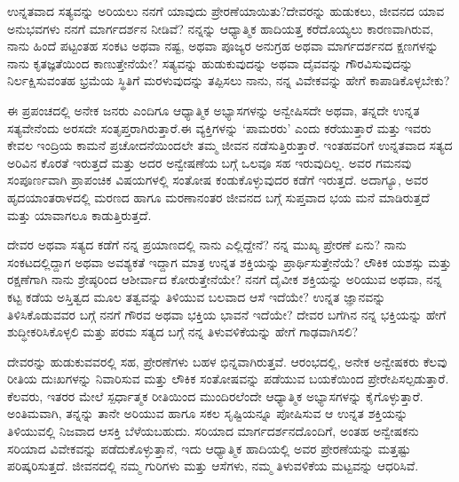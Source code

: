\begin{mananam}{}
\nfntmtxt ಉನ್ನತವಾದ ಸತ್ಯವನ್ನು ಅರಿಯಲು ನನಗೆ ಯಾವುದು ಪ್ರೇರಣೆಯಾಯಿತು?ದೇವರನ್ನು ಹುಡುಕಲು, ಜೀವನದ ಯಾವ ಅನುಭವಗಳು  ನನಗೆ ಮಾರ್ಗದರ್ಶನ ನೀಡಿವೆ? 
ನನ್ನನ್ನು ಆಧ್ಯಾತ್ಮಿಕ ಹಾದಿಯತ್ತ ಕರೆದೊಯ್ಯಲು ಕಾರಣವಾಗಿರುವ, ನಾನು ಹಿಂದೆ ಪಟ್ಟಂತಹ ಸಂಕಟ ಅಥವಾ ನಷ್ಟ, ಅಥವಾ ಪೂಜ್ಯರ ಅನುಗ್ರಹ ಅಥವಾ ಮಾರ್ಗದರ್ಶನದ ಕ್ಷಣಗಳನ್ನು ನಾನು ಕೃತಜ್ಞತೆಯಿಂದ ಕಾಣುತ್ತೇನೆಯೇ?
ಸತ್ಯವನ್ನು ಹುಡುಕುವುದನ್ನು ಅಥವಾ ದೈವವನ್ನು ಗೌರವಿಸುವುದನ್ನು ನಿರ್ಲಕ್ಷಿಸುವಂತಹ ಭ್ರಮೆಯ ಸ್ಥಿತಿಗೆ ಮರಳುವುದನ್ನು ತಪ್ಪಿಸಲು ನಾನು, ನನ್ನ ವಿವೇಕವನ್ನು ಹೇಗೆ ಕಾಪಾಡಿಕೊಳ್ಳಬೇಕು?
\end{mananam}
\sReflect
\begin{inspiration}{}
\nfntmtxt ಈ ಪ್ರಪಂಚದಲ್ಲಿ ಅನೇಕ ಜನರು ಎಂದಿಗೂ ಆಧ್ಯಾತ್ಮಿಕ ಅಭ್ಯಾಸಗಳನ್ನು ಅನ್ವೇಷಿಸದೇ ಅಥವಾ, ತನ್ನದೇ ಉನ್ನತ ಸತ್ಯವೇನೆಂದು ಅರಸದೇ ಸಂತೃಪ್ತರಾಗಿರುತ್ತಾರೆ.ಈ ವ್ಯಕ್ತಿಗಳನ್ನು ‘ಪಾಮರರು’ ಎಂದು ಕರೆಯುತ್ತಾರೆ ಮತ್ತು ಇವರು ಕೇವಲ ಇಂದ್ರಿಯ ಕಾಮನೆ ಪ್ರಚೋದನೆಯಿಂದಲೇ ತಮ್ಮ ಜೀವನ ನಡೆಸುತ್ತಿರುತ್ತಾರೆ. ಇಂತಹವರಿಗೆ ಉನ್ನತವಾದ ಸತ್ಯದ ಅರಿವಿನ ಕೊರತೆ ಇರುತ್ತದೆ ಮತ್ತು ಅದರ ಅನ್ವೇಷಣೆಯ ಬಗ್ಗೆ ಒಲವೂ ಸಹ ಇರುವುದಿಲ್ಲ. ಅವರ ಗಮನವು ಸಂಪೂರ್ಣವಾಗಿ ಪ್ರಾಪಂಚಿಕ  ವಿಷಯಗಳಲ್ಲಿ ಸಂತೋಷ ಕಂಡುಕೊಳ್ಳುವುದರ ಕಡೆಗೆ ಇರುತ್ತದೆ. ಅದಾಗ್ಯೂ, ಅವರ ಹೃದಯಾಂತರಾಳದಲ್ಲಿ  ಮರಣದ ಹಾಗೂ ಮರಣಾನಂತರ  ಜೀವನದ ಬಗ್ಗೆ ಸುಪ್ತವಾದ ಭಯ ಮನೆ ಮಾಡಿರುತ್ತದೆ ಮತ್ತು  ಯಾವಾಗಲೂ ಕಾಡುತ್ತಿರುತ್ತದೆ.
\end{inspiration}
\newpage


\begin{mananam}{}
\nfntmtxt ದೇವರ ಅಥವಾ ಸತ್ಯದ ಕಡೆಗೆ ನನ್ನ ಪ್ರಯಾಣದಲ್ಲಿ ನಾನು ಎಲ್ಲಿದ್ದೇನೆ? ನನ್ನ ಮುಖ್ಯ ಪ್ರೇರಣೆ ಏನು? ನಾನು  ಸಂಕಟದಲ್ಲಿದ್ದಾಗ ಅಥವಾ ಅವಶ್ಯಕತೆ ಇದ್ದಾಗ ಮಾತ್ರ ಉನ್ನತ ಶಕ್ತಿಯನ್ನು ಪ್ರಾರ್ಥಿಸುತ್ತೇನೆಯೆ? ಲೌಕಿಕ ಯಶಸ್ಸು ಮತ್ತು ರಕ್ಷಣೆಗಾಗಿ ನಾನು ಶ್ರೇಷ್ಠರಿಂದ ಆಶೀರ್ವಾದ ಕೋರುತ್ತೇನೆಯೇ? ನನಗೆ ದೈವೀಕ ಶಕ್ತಿಯನ್ನು ಅರಿಯುವ ಅಥವಾ, ನನ್ನ ಕಟ್ಟ ಕಡೆಯ ಅಸ್ತಿತ್ವದ ಮೂಲ ತತ್ವವನ್ನು ತಿಳಿಯುವ ಬಲವಾದ ಆಸೆ ಇದೆಯೇ?  ಉನ್ನತ ಜ್ಞಾನವನ್ನು ತಿಳಿಸಿಕೊಡುವವರ ಬಗ್ಗೆ ನನಗೆ ಗೌರವ   ಅಥವಾ ಭಕ್ತಿಯ ಭಾವನೆ ಇದೆಯೇ? ದೇವರ ಬಗೆಗಿನ ನನ್ನ ಭಕ್ತಿಯನ್ನು ಹೇಗೆ ಶುದ್ಧೀಕರಿಸಿಕೊಳ್ಳಲಿ ಮತ್ತು ಪರಮ ಸತ್ಯದ  ಬಗ್ಗೆ ನನ್ನ ತಿಳುವಳಿಕೆಯನ್ನು ಹೇಗೆ ಗಾಢವಾಗಿಸಲಿ?
\end{mananam}
\sReflect
\begin{inspiration}{}
\nfntmtxt ದೇವರನ್ನು ಹುಡುಕುವವರಲ್ಲಿ ಸಹ, ಪ್ರೇರಣೆಗಳು ಬಹಳ ಭಿನ್ನವಾಗಿರುತ್ತವೆ. ಆರಂಭದಲ್ಲಿ, ಅನೇಕ ಅನ್ವೇಷಕರು ಕೆಲವು ರೀತಿಯ ದುಃಖಗಳನ್ನು ನಿವಾರಿಸುವ ಮತ್ತು ಲೌಕಿಕ ಸಂತೋಷವನ್ನು ಪಡೆಯುವ ಬಯಕೆಯಿಂದ ಪ್ರೇರೇಪಿಸಲ್ಪಡುತ್ತಾರೆ. ಕೆಲವರು, ಇತರರ ಮೇಲೆ ಸ್ಪರ್ಧಾತ್ಮಕ ರೀತಿಯಿಂದ ಮುಂದಿರಲೆಂದೇ  ಆಧ್ಯಾತ್ಮಿಕ ಅಭ್ಯಾಸಗಳನ್ನು ಕೈಗೊಳ್ಳುತ್ತಾರೆ. ಅಂತಿಮವಾಗಿ, ತನ್ನನ್ನು ತಾನೇ ಅರಿಯುವ ಹಾಗೂ ಸಕಲ ಸೃಷ್ಟಿಯನ್ನೂ ಪೋಷಿಸುವ ಆ ಉನ್ನತ ಶಕ್ತಿಯನ್ನು ತಿಳಿಯುವಲ್ಲಿ ನಿಜವಾದ ಆಸಕ್ತಿ ಬೆಳೆಯಬಹುದು. ಸರಿಯಾದ ಮಾರ್ಗದರ್ಶನದೊಂದಿಗೆ, ಅಂತಹ ಅನ್ವೇಷಕನು ಸರಿಯಾದ ವಿವೇಕವನ್ನು ಪಡೆದುಕೊಳ್ಳುತ್ತಾನೆ, ಇದು ಆಧ್ಯಾತ್ಮಿಕ ಹಾದಿಯಲ್ಲಿ ಅವರ ಪ್ರೇರಣೆಯನ್ನು ಮತ್ತಷ್ಟು ಪರಿಷ್ಕರಿಸುತ್ತದೆ. ಜೀವನದಲ್ಲಿ ನಮ್ಮ ಗುರಿಗಳು ಮತ್ತು ಆಸೆಗಳು, ನಮ್ಮ ತಿಳುವಳಿಕೆಯ ಮಟ್ಟವನ್ನು ಆಧರಿಸಿವೆ.
\end{inspiration}
\newpage

